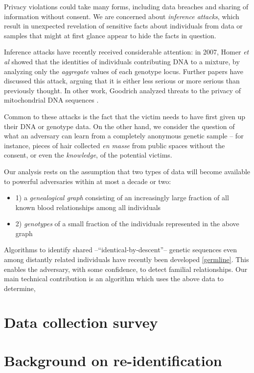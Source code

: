 \documentclass{article}
\begin{document}
Privacy violations could take many forms, including data breaches and sharing of information without consent. We are concerned about {\em inference attacks}, which result in unexpected revelation of sensitive facts about individuals from data or samples that might at first glance appear to hide the facts in question.

Inference attacks have recently received considerable attention: in 2007, Homer {\em et al} showed that the identities of individuals contributing DNA to a mixture, by analyzing only the {\em aggregate} values of each genotype locus. Further papers have discussed this attack, arguing that it is either less serious \cite{sriram} or more serious \cite{css} than previously thought.  In other work, Goodrich analyzed threats to the privacy of mitochondrial DNA sequences \cite{goodrich}.

Common to these attacks is the fact that the victim needs to have first given up their DNA or genotype data. On the other hand, we consider the question of what an adversary can learn from a completely anonymous genetic sample -- for instance, pieces of hair collected {\em en masse} from public spaces without the consent, or even the {\em knowledge}, of the potential victims.

 Our analysis rests on the assumption that two types of data will become available to powerful adversaries within at most a decade or two: 
\begin{itemize}
\item
1) a {\em genealogical graph} consisting of an increasingly large fraction of all known blood relationships among all individuals
\item
2) {\em genotypes} of a small fraction of the individuals represented in the above graph
\end{itemize}

Algorithms to identify shared --``identical-by-descent''-- genetic sequences even among distantly related individuals have recently been developed \ref{germline}. This enables the adversary, with some confidence, to detect familial relationships. Our main technical contribution is an algorithm which uses the above data to determine,

\section{Data collection survey}

\section{Background on re-identification}
\end{document}
